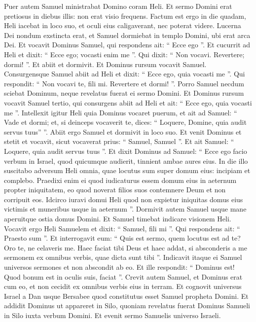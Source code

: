 \begin{biblechapter}
\begin{biblechapter}
\begin{biblechapter}
\verse Puer autem Samuel ministrabat Domino coram Heli. Et sermo Domini erat pretiosus in diebus illis: non erat visio frequens. 
\verse Factum est ergo in die quadam, Heli iacebat in loco suo, et oculi eius caligaverant, nec poterat videre. 
\verse Lucerna Dei nondum exstincta erat, et Samuel dormiebat in templo Domini, ubi erat arca Dei. 
\verse Et vocavit Dominus Samuel, qui respondens ait: “ Ecce ego ”. 
\verse Et cucurrit ad Heli et dixit: “ Ecce ego; vocasti enim me ”. Qui dixit: “ Non vocavi. Revertere; dormi! ”. Et abiit et dormivit.
 \verse Et Dominus rursum vocavit Samuel. Consurgensque Samuel abiit ad Heli et dixit: “ Ecce ego, quia vocasti me ”. Qui respondit: “ Non vocavi te, fili mi. Revertere et dormi! ”. 
\verse Porro Samuel necdum sciebat Dominum, neque revelatus fuerat ei sermo Domini.
 \verse Et Dominus rursum vocavit Samuel tertio, qui consurgens abiit ad Heli 
\verse et ait: “ Ecce ego, quia vocasti me ”. Intellexit igitur Heli quia Dominus vocaret puerum, et ait ad Samuel: “ Vade et dormi; et, si deinceps vocaverit te, dices: “ Loquere, Domine, quia audit servus tuus” ”. Abiit ergo Samuel et dormivit in loco suo.
 \verse Et venit Dominus et stetit et vocavit, sicut vocaverat prius: “ Samuel, Samuel ”. Et ait Samuel: “ Loquere, quia audit servus tuus ”. 
\verse Et dixit Dominus ad Samuel: “ Ecce ego facio verbum in Israel, quod quicumque audierit, tinnient ambae aures eius. 
\verse In die illo suscitabo adversum Heli omnia, quae locutus sum super domum eius: incipiam et complebo. 
\verse Praedixi enim ei quod iudicaturus essem domum eius in aeternum propter iniquitatem, eo quod noverat filios suos contemnere Deum et non corripuit eos. 
\verse Idcirco iuravi domui Heli quod non expietur iniquitas domus eius victimis et muneribus usque in aeternum ”.
 \verse Dormivit autem Samuel usque mane aperuitque ostia domus Domini. Et Samuel timebat indicare visionem Heli. 
\verse Vocavit ergo Heli Samuelem et dixit: “ Samuel, fili mi ”. Qui respondens ait: “ Praesto sum ”. 
\verse Et interrogavit eum: “ Quis est sermo, quem locutus est ad te? Oro te, ne celaveris me. Haec faciat tibi Deus et haec addat, si absconderis a me sermonem ex omnibus verbis, quae dicta sunt tibi ”. 
\verse Indicavit itaque ei Samuel universos sermones et non abscondit ab eo. Et ille respondit: “ Dominus est! Quod bonum est in oculis suis, faciat ”.
 \verse Crevit autem Samuel, et Dominus erat cum eo, et non cecidit ex omnibus verbis eius in terram. 
\verse Et cognovit universus Israel a Dan usque Bersabee quod constitutus esset Samuel propheta Domini. 
\verse Et addidit Dominus ut appareret in Silo, quoniam revelatus fuerat Dominus Samueli in Silo iuxta verbum Domini. Et evenit sermo Samuelis universo Israeli.
 

\end{biblechapter}
\end{biblechapter}
\end{biblechapter}
